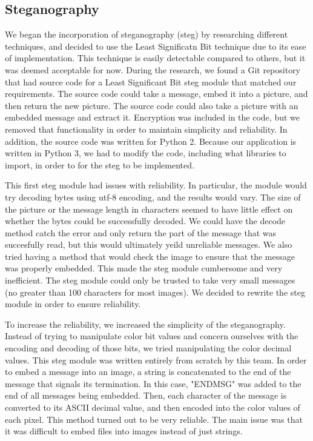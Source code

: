 \subsection{Steganography}

We began the incorporation of steganography (steg) by researching different techniques, and decided to use the Least Significatn Bit technique due to its ease of implementation. This technique is easily detectable compared to others, but it was deemed acceptable for now. During the research, we found a Git repository that had source code for a Least Significant Bit steg module that matched our requirements. The source code could take a message, embed it into a picture, and then return the new picture. The source code could also take a picture with an embedded message and extract it. Encryption was included in the code, but we removed that functionality in order to maintain simplicity and reliability. In addition, the source code was written for Python 2. Because our application is written in Python 3, we had to modify the code, including what libraries to import, in order to for the steg to be implemented. \smallskip

This first steg module had issues with reliability. In particular, the module would try decoding bytes using utf-8 encoding, and the results would vary. The size of the picture or the message length in characters seemed to have little effect on whether the bytes could be successfully decoded. We could have the decode method catch the error and only return the part of the message that was succesfully read, but this would ultimately yeild unreliable messages. We also tried having a method that would check the image to ensure that the message was properly embedded. This made the steg module cumbersome and very inefficient. The steg module could only be trusted to take very small messages (no greater than 100 characters for most images). We decided to rewrite the steg module in order to ensure reliability.\smallskip

To increase the reliability, we increased the simplicity of the steganography. Instead of trying to manipulate color bit values and
concern ourselves with the encoding and decoding of those bits, we tried manipulating the color decimal values. This steg module was written entirely from scratch by this team. In order to embed a message into an image, a string is concatenated to the end of the message that signals its termination. In this case, "ENDMSG" was added to the end of all messages being embedded. Then, each character of the message is converted to its ASCII decimal value, and then encoded into the color values of each pixel. This method turned out to be very reliable. The main issue was that it was difficult to embed files into images instead of just strings. \smallskip

